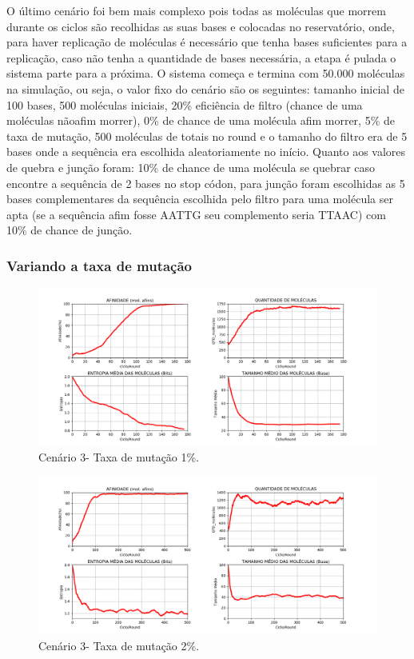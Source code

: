 O último cenário foi bem mais complexo pois todas as moléculas que morrem
durante os ciclos são recolhidas as suas bases e colocadas no reservatório, onde, para
haver replicação de moléculas é necessário que tenha bases suficientes para a
replicação, caso não tenha a quantidade de bases necessária, a etapa é pulada o sistema
parte para a próxima. O sistema começa e termina com 50.000 moléculas na
simulação, ou seja, o valor fixo do cenário são os seguintes: tamanho inicial de 100
bases, 500 moléculas iniciais, 20\% eficiência de filtro (chance de uma moléculas nãoafim morrer), 0\% de chance de uma molécula afim morrer, 5\% de taxa de mutação,
500 moléculas de totais no round e o tamanho do filtro era de 5 bases onde a sequência
era escolhida aleatoriamente no início. Quanto aos valores de quebra e junção foram:
10\% de chance de uma molécula se quebrar caso encontre a sequência de 2 bases no
stop códon, para junção foram escolhidas as 5 bases complementares da sequência
escolhida pelo filtro para uma molécula ser apta (se a sequência afim fosse AATTG
seu complemento seria TTAAC) com 10\% de chance de junção.

\subsubsection{Variando a taxa de mutação}

\begin{figure}[!h]
    \centering
    \includegraphics[width=15cm]{figures/image21_alpha01_beta_10.png}
    \caption{Cenário 3- Taxa de mutação 1\%.}
    \label{fig:image21_alpha01_beta_10}
\end{figure}

\begin{figure}[!h]
    \centering
    \includegraphics[width=15cm]{figures/image22_alpha02_beta_10.png}
    \caption{Cenário 3- Taxa de mutação 2\%.}
    \label{fig:image22_alpha02_beta_10}
\end{figure}

